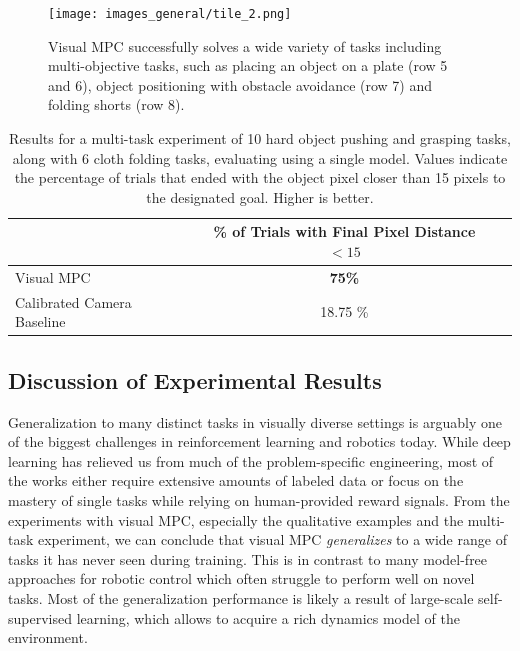 \begin{figure}
	\centering
	\texttt{[image: images\_general/tile\_2.png]}
	\caption{Visual MPC successfully solves a wide variety of tasks including multi-objective tasks, such as placing an object on a plate (row 5 and 6), object positioning with obstacle avoidance (row 7) and folding shorts (row 8).   
		\label{fig:tile_2}}
\end{figure}

\label{subsec:cloth_folding_data}
\begin{table}
\centering
{\footnotesize
\begin{tabular}{lcc}
	\toprule
         &  \thead{\% of Trials with \\ Final Pixel Distance $< 15$}   \\
         \midrule
  Visual MPC & \textbf{75\%} \\ 
  Calibrated Camera Baseline & 18.75 \% \\
  \bottomrule
\end{tabular}
}
\caption{Results for a multi-task experiment of 10 hard object pushing and grasping tasks, along with 6 cloth folding tasks, evaluating using a single model. Values indicate the percentage of trials that ended with the object pixel closer than 15 pixels to the designated goal. Higher is better.} 
\label{table:cloth_folding}
\end{table}

\subsection{Discussion of Experimental Results}

Generalization to many distinct tasks in visually diverse settings is arguably one of the biggest challenges in reinforcement learning and robotics today. While deep learning has relieved us from much of the problem-specific engineering, most of the works either require extensive amounts of labeled data or focus on the mastery of single tasks while relying on human-provided reward signals. 
From the experiments with visual MPC, especially the qualitative examples and the multi-task experiment, we can conclude that visual MPC \emph{generalizes} to a wide range of tasks it has never seen during training. This is in contrast to many model-free approaches for robotic control which often struggle to perform well on novel tasks. Most of the generalization performance is likely a result of large-scale self-supervised learning, which allows to acquire a rich dynamics model of the environment. 